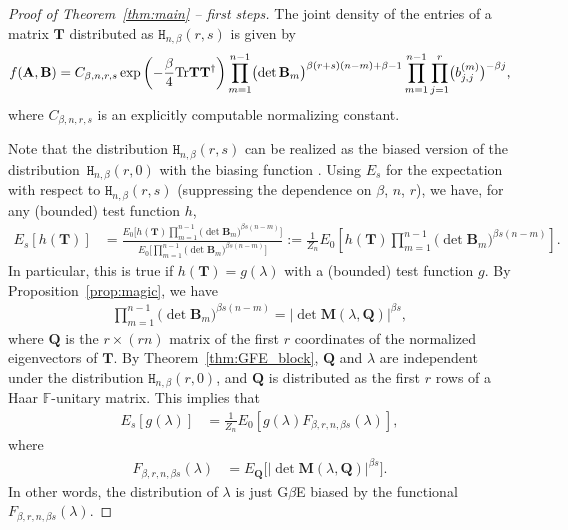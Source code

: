 \documentclass[pdftex]{sigma}
\numberwithin{equation}{section}
\theoremstyle{definition}
\newcommand{\FF}{{\mathbb{F}}}
\newcommand{\Tr}{\textup{Tr}}
\newcommand{\T}{\dag}
\newcommand{\mbf}[1]{\mathbf{#1}}
\newcommand{\HH}{\mathtt{H}_{n,\beta}}
\begin{document}
\begin{proof}[Proof of Theorem~\ref{thm:main} -- first steps]
The joint density of the entries of a matrix $\mbf{T}$ distributed as $\HH(r,s)$ is given by
\begin{align*}
 f(\mbf{A},\mbf{B})=C_{\beta,n,r,s} \exp\left(-\frac{\beta}{4} \Tr \mbf{T} \mbf{T}^{\T}\right) \prod_{m=1}^{n-1} \bigl(\det \mbf{B}_m\bigr)^{\beta(r+s)(n-m)+\beta-1} \prod_{m=1}^{n-1} \prod_{j=1}^r \bigl(b_{j,j}^{(m)}\bigr)^{-\beta j},
\end{align*}
where $C_{\beta, n, r, s}$ is an explicitly computable normalizing constant.


Note that the distribution $\HH(r,s)$ can be realized as the biased version of the distribution~$\HH(r,0)$ with the biasing function
\smash{$
\prod_{m=1}^{n-1} \bigl(\det \mbf{B}_m\bigr)^{\beta s(n-m)}$}.
Using $E_{s}$ for the expectation with respect to $\HH(r,s)$ (suppressing the dependence on $\beta$, $n$, $r$), we have, for any (bounded) test function $h$,
\begin{align*}
E_{s}[h(\mbf{T})] & =\frac{E_{0}\big[h(\mbf{T})\prod_{m=1}^{n-1} \bigl(\det \mbf{B}_m\bigr)^{\beta s(n-m)} \big]} {E_{0}\big[\prod_{m=1}^{n-1} \bigl(\det \mbf{B}_m\bigr)^{\beta s(n-m)} \big]}
 := \frac{1}{Z_n} E_{0}\left[h(\mbf{T})\prod_{m=1}^{n-1} \bigl(\det \mbf{B}_m\bigr)^{\beta s(n-m)} \right].
\end{align*}
In particular, this is true if $h(\mbf{T})=g({\lambda})$ with a (bounded) test function $g$. By Proposition~\ref{prop:magic}, we have
\begin{align}\label{eq:magic_identity}
 \prod_{m=1}^{n-1} \bigl(\det \mbf{B}_m\bigr)^{\beta s(n-m)}=|{\det \mbf{M}({\lambda}, \mbf{Q})}|^{\beta s},
\end{align}
where $\mbf{Q}$ is the $r\times (rn)$ matrix of the first $r$ coordinates of the normalized eigenvectors of $\mbf{T}$. By Theorem~\ref{thm:GFE_block}, $\mbf{Q}$ and ${\lambda}$ are independent under the distribution $\HH(r,0)$, and $\mbf{Q}$ is distributed as the first $r$ rows of a Haar $\FF$-unitary matrix. This implies that
\begin{align*}
 E_{s}[g({\lambda})] & = \frac{1}{Z_n} E_{0}\left[g({\lambda}) F_{\beta,r,n, \beta s}({\lambda})\right],
\end{align*}
where
 \begin{align}
 \label{Reweight}
 F_{\beta, r,n, \beta s}({\lambda}) & =
 E_{\boldsymbol{Q}} \big[|{\det \mbf{M}({\lambda}, \mbf{Q})}|^{\beta s}\big].
\end{align}
In other words, the distribution of ${\lambda}$ is just G$\beta$E biased by the functional $
F_{\beta, r,n,\beta s}({\lambda})$.


\end{proof}
\end{document}
